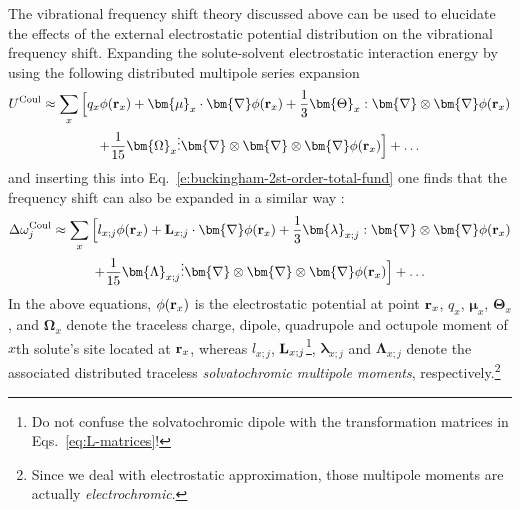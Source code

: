 \documentclass[b5paper,oneside,fleqn,11pt]{book}
\newcommand{\BM}[1]{\bm{#1}}
\begin{document}
\begin{refsection}
The vibrational frequency shift theory discussed above 
can be used
to elucidate the effects of the external electrostatic 
potential distribution on the vibrational frequency shift.
Expanding the solute-solvent electrostatic interaction energy by using the
following distributed multipole series 
expansion \citep{Stone.TheTheoryOfIntermolecularForces.1996}
%
\begin{multline} \label{e:dmtp}
 U^{\rm Coul} \approx  \sum_x \Big[ q_x \phi({\bf r}_x) + 
                  {\BM \mu}_x \cdot {\BM \nabla} \phi({\bf r}_x)   + 
      \frac{1}{3} {\BM \Theta}_x : {\BM \nabla} \otimes {\BM \nabla} \phi({\bf r}_x)   \\ + 
     \frac{1}{15} {\BM \Omega}_x \vdots {\BM \nabla} \otimes {\BM \nabla} \otimes {\BM \nabla} \phi({\bf r}_x) \Big] + \ldots
\end{multline}
%
and inserting this into Eq.~\eqref{e:buckingham-2st-order-total-fund} 
one finds that the frequency shift can also be expanded
in a similar way \citep{Cho.JCP.2009}:
%
\begin{multline} \label{e:dmtp-sol}
 \Delta\omega_j^{\rm Coul} \approx  \sum_x \Big[ l_{x;j} \phi({\bf r}_x) + 
                        {\bf L}_{x;j} \cdot {\BM \nabla} \phi({\bf r}_x)   + 
      \frac{1}{3} {\BM \lambda}_{x;j} : {\BM \nabla} \otimes {\BM \nabla} \phi({\bf r}_x)   \\ + 
     \frac{1}{15} {\BM \Lambda}_{x;j} \vdots {\BM \nabla} \otimes {\BM \nabla} \otimes {\BM \nabla} \phi({\bf r}_x) \Big] + \ldots
\end{multline}
%
In the above equations, $\phi({\bf r}_x)$ is the electrostatic
potential at point ${\bf r}_x$,
$q_x$, ${\BM \mu}_x$, ${\BM \Theta}_x$, and ${\BM \Omega}_x$ 
denote the traceless charge, dipole, quadrupole and octupole moment 
of $x$th solute's site located at ${\bf r}_x$, whereas 
$l_{x;j}$, ${\bf L}_{x;j}$\footnote{Do not confuse the solvatochromic
dipole with the transformation matrices in Eqs.~\eqref{eq:L-matrices}!}, 
${\BM \lambda}_{x;j}$ and ${\BM \Lambda}_{x;j}$ 
denote the associated distributed traceless
\emph{solvatochromic multipole moments}, respectively.\footnote{Since we deal with 
electrostatic approximation, those multipole moments are actually \emph{electrochromic}.}


\end{refsection}
\end{document}
